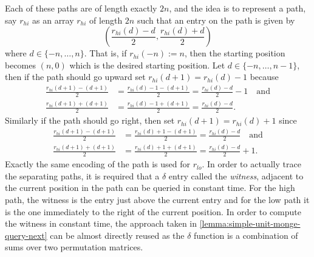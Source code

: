 \documentclass[twoside,11pt,openright]{report}
\begin{document}
Each of these paths are of length exactly $2n$, and the idea is to represent a path, say $r_{hi}$ as an array $r_{hi}$ of length $2n$ such that an entry on the path is given by
\[
  \left( \frac{r_{hi}(d) - d}{2}, \frac{r_{hi}(d) + d}{2} \right)
\]
where $d \in \{-n, \dots, n\}$. That is, if $r_{hi}(-n) := n$, then the starting position becomes $(n, 0)$ which is the desired starting position. Let $d \in \{-n, \dots, n - 1\}$, then if the path should go upward set $r_{hi}(d + 1) = r_{hi}(d) - 1$ because
\begin{align*}
  \frac{r_{hi}(d + 1) - (d + 1)}{2} &= \frac{r_{hi}(d) - 1 - (d + 1)}{2} = \frac{r_{hi}(d) - d}{2} - 1 \quad \text{and} \\
  \frac{r_{hi}(d + 1) + (d + 1)}{2} &= \frac{r_{hi}(d) - 1 + (d + 1)}{2} = \frac{r_{hi}(d) - d}{2}.
\end{align*}
Similarly if the path should go right, then set $r_{hi}(d + 1) = r_{hi}(d) + 1$ since
\begin{align*}
  \frac{r_{hi}(d + 1) - (d + 1)}{2} &= \frac{r_{hi}(d) + 1 - (d + 1)}{2} = \frac{r_{hi}(d) - d}{2} \quad \text{and} \\
  \frac{r_{hi}(d + 1) + (d + 1)}{2} &= \frac{r_{hi}(d) + 1 + (d + 1)}{2} = \frac{r_{hi}(d) - d}{2} + 1.
\end{align*}
Exactly the same encoding of the path is used for $r_{lo}$. In order to actually trace the separating paths, it is required that a $\delta$ entry called the \textit{witness}, adjacent to the current position in the path can be queried in constant time. For the high path, the witness is the entry just above the current entry and for the low path it is the one immediately to the right of the current position. In order to compute the witness in constant time, the approach taken in \cref{lemma:simple-unit-monge-query-next} can be almost directly reused as the $\delta$ function is a combination of sums over two permutation matrices.
\end{document}
